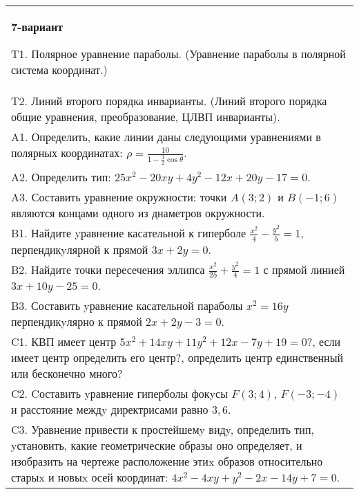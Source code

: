 \documentclass{article}
\begin{document}
\begin{tabular}{m{17cm}}
\textbf{7-вариант}
\newline

T1. Полярное уравнение параболы. (Уравнение параболы в полярной система координат.)\\

T2. Линий второго порядка инварианты. (Линий второго порядка общие уравнения, преобразование, ЦЛВП инварианты).\\

A1. Определить, какие линии даны следующими уравнениями в полярных координатах: $\rho=\frac{10}{1-\frac{3}{2}\cos\theta}$.\\

A2. Определить тип: $25x^{2}-20xy+4y^{2}-12x+20y-17=0$.\\

A3. Составить уравнение окружности: точки $A(3;2)$ и $B(-1;6)$ являются концами одного из днаметров окружности.\\

B1. Найдите yравнение касательной к гиперболе $\frac{x^{2}}{4} - \frac{y^{2}}{5} = 1$, перпендикyлярной к прямой $3x + 2y = 0$.\\

B2. Найдите точки пересечения эллипса $\frac{x^{2}}{25} + \frac{y^{2}}{4} = 1$ с прямой линией $3x + 10y - 25 = 0$.  \\

B3. Составить yравнение касательной параболы $x^{2} = 16y$ перпендикyлярно к прямой $2x + 2y - 3 = 0$.  \\

C1. КВП имеет центр $5x^{2}+14xy+11y^{2}+12x-7y+19=0$?, если имеет центр определить его центр?, определить центр единственный или бесконечно много?  \\

C2. Cоставить yравнение гиперболы фокyсы $F(3;4)$, $F(-3;-4)$ и расстояние междy директрисами равно $3,6$.  \\

C3. Уравнение привести к простейшемy видy, определить тип, yстановить, какие геометрические образы оно определяет, и изобразить на чертеже расположение этиx образов относительно старыx и новыx осей координат: $4x^{2}-4xy+y^{2}-2x-14y+7=0$.  \\

\end{tabular}
\vspace{1cm}
\end{document}
